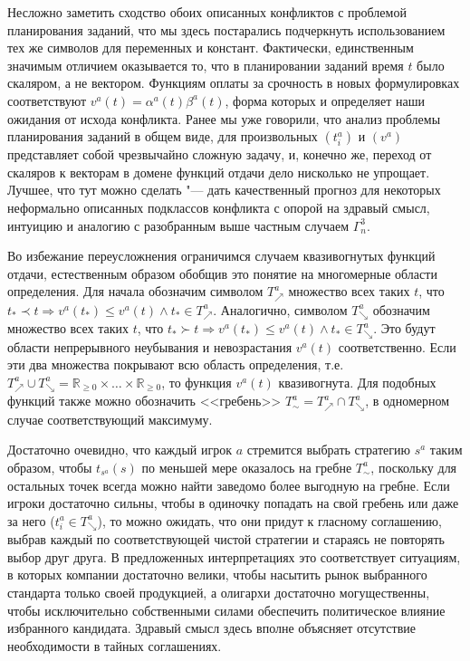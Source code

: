 Несложно заметить сходство обоих описанных конфликтов с проблемой планирования заданий, что мы здесь постарались подчеркнуть использованием тех же символов для переменных и констант. Фактически, единственным значимым отличием оказывается то, что в планировании заданий время $t$ было скаляром, а не вектором. Функциям оплаты за срочность в новых формулировках соответствуют $v^a(t) = \alpha^a(t) \beta^a(t)$, форма которых и определяет наши ожидания от исхода конфликта. Ранее мы уже говорили, что анализ проблемы планирования заданий в общем виде, для произвольных $(t_i^a)$ и $(v^a)$ представляет собой чрезвычайно сложную задачу, и, конечно же, переход от скаляров к векторам в домене функций отдачи дело нисколько не упрощает. Лучшее, что тут можно сделать "--- дать качественный прогноз для некоторых неформально описанных подклассов конфликта с опорой на здравый смысл, интуицию и аналогию с разобранным выше частным случаем $\Gamma^3_n$.

Во избежание переусложнения ограничимся случаем квазивогнутых функций отдачи, естественным образом обобщив это понятие на многомерные области определения. Для начала обозначим символом $T^a_{\nearrow}$ множество всех таких $t$, что $t_* \prec t \Rightarrow v^a(t_*) \le v^a(t) \wedge t_* \in T^a_{\nearrow}$. Аналогично, символом $T^a_{\searrow}$ обозначим множество всех таких $t$, что $t_* \succ t \Rightarrow v^a(t_*) \le v^a(t) \wedge t_* \in T^a_{\searrow}$. Это будут области непрерывного неубывания и невозрастания $v^a(t)$ соответственно. Если эти два множества покрывают всю область определения, т.е. $T^a_{\nearrow} \cup T^a_{\searrow} = \mathbb{R}_{\ge 0} \times \ldots \times \mathbb{R}_{\ge 0}$, то функция $v^a(t)$ квазивогнута. Для подобных функций также можно обозначить <<гребень>> $T^a_{\sim} = T^a_{\nearrow} \cap T^a_{\searrow}$, в одномерном случае соответствующий максимуму.

Достаточно очевидно, что каждый игрок $a$ стремится выбрать стратегию $s^a$ таким образом, чтобы $t_{s^a}(s)$ по меньшей мере оказалось на гребне $T^a_{\sim}$, поскольку для остальных точек всегда можно найти заведомо более выгодную на гребне. Если игроки достаточно сильны, чтобы в одиночку попадать на свой гребень или даже за него ($t^a_i \in T^a_{\searrow}$), то можно ожидать, что они придут к гласному соглашению, выбрав каждый по соответствующей чистой стратегии и стараясь не повторять выбор друг друга. В предложенных интерпретациях это соответствует ситуациям, в которых компании достаточно велики, чтобы насытить рынок выбранного стандарта только своей продукцией, а олигархи достаточно могущественны, чтобы исключительно собственными силами обеспечить политическое влияние избранного кандидата. Здравый смысл здесь вполне объясняет отсутствие необходимости в тайных соглашениях.

